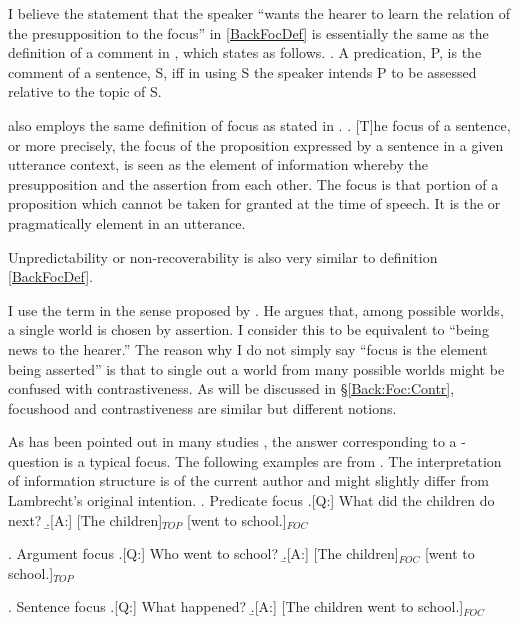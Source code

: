I believe the statement that the speaker ``wants the hearer to learn the relation of the presupposition to the focus'' in \ref{BackFocDef} is essentially the same as the definition of a comment in ,
which states as follows.
%
\ex. A predication, P, is the comment of a sentence, S, iff in using S the speaker intends P to be assessed relative to the topic of S.
     \hfill{\cite[210]{gundel88}}

 \cite[based on][]{halliday67} also employs the same definition of focus as stated in \Next.
%
\ex. [T]he focus of a sentence, or more precisely,
  the focus of the proposition expressed by a sentence
  in a given utterance context,
  is seen as the element of information whereby the presupposition 
  and the assertion  from each other.
  The focus is that portion of a proposition which
  cannot be taken for granted at the time of speech.
  It is the  or pragmatically
   element in an utterance.
  \hfill{\cite[207, underlined by the original author]{lambrecht94}}

Unpredictability or non-recoverability \cite[see also][]{kuno72} is also very similar to definition \ref{BackFocDef}.

I use the term  in the sense proposed by .
He argues that, among possible worlds, a single world is chosen by assertion.
I consider this to be equivalent to ``being news to the hearer.''
The reason why I do not simply say ``focus is the element being asserted'' is that
to single out a world from many possible worlds might be confused with contrastiveness.
As will be discussed in \S \ref{Back:Foc:Contr},
focushood and contrastiveness are similar but different notions.

As has been pointed out in many studies \cite[e.g.,][]{matsushita28,chomsky65,gundel74},
the answer corresponding to a -question is a typical focus.
The following examples are from .
The interpretation of information structure is of the current author
and might slightly differ from Lambrecht's original intention.
%
\ex. \label{BackLambPredFoc}{Predicate focus}
	\a.[Q:] What did the children do next?
	\b.[A:] {[The children]$_{TOP}$ [went to school.]$_{FOC}$}

\ex. \label{BackLambArgFoc}{Argument focus}
	\a.[Q:] Who went to school?
	\b.[A:] {[The children]$_{FOC}$ [went to school.]$_{TOP}$}

\ex. \label{BackLambAllFoc}{Sentence focus}
	\a.[Q:] What happened?
	\b.[A:] {[The children went to school.]$_{FOC}$}


